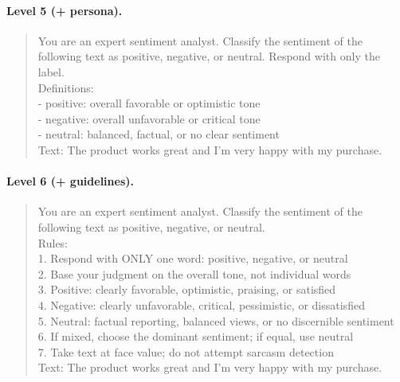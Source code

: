 \paragraph{Level 5 (+ persona).}
\begin{quote}\small\ttfamily
You are an expert sentiment analyst. Classify the sentiment of the following
text as positive, negative, or neutral. Respond with only the label.\\[4pt]
Definitions:\\
- positive: overall favorable or optimistic tone\\
- negative: overall unfavorable or critical tone\\
- neutral: balanced, factual, or no clear sentiment\\[4pt]
Text: The product works great and I'm very happy with my purchase.
\end{quote}

\paragraph{Level 6 (+ guidelines).}
\begin{quote}\small\ttfamily
You are an expert sentiment analyst. Classify the sentiment of the following
text as positive, negative, or neutral.\\[4pt]
Rules:\\
1. Respond with ONLY one word: positive, negative, or neutral\\
2. Base your judgment on the overall tone, not individual words\\
3. Positive: clearly favorable, optimistic, praising, or satisfied\\
4. Negative: clearly unfavorable, critical, pessimistic, or dissatisfied\\
5. Neutral: factual reporting, balanced views, or no discernible sentiment\\
6. If mixed, choose the dominant sentiment; if equal, use neutral\\
7. Take text at face value; do not attempt sarcasm detection\\[4pt]
Text: The product works great and I'm very happy with my purchase.
\end{quote}

